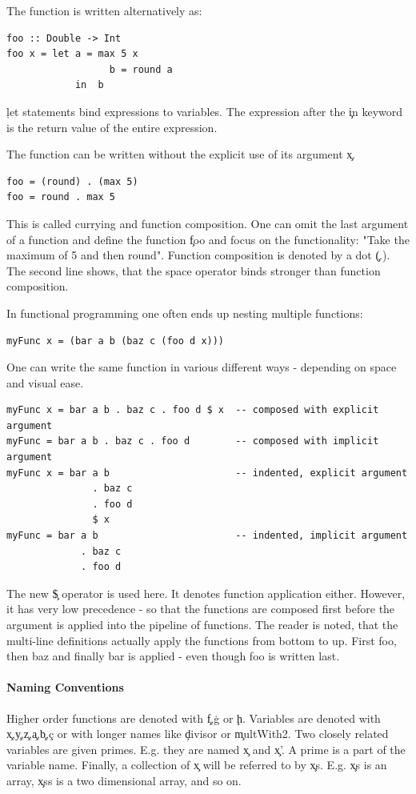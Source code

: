     The function is written alternatively as:
    \begin{lstlisting}
foo :: Double -> Int
foo x = let a = max 5 x
                  b = round a
            in  b
    \end{lstlisting}
    \c{let} statements bind expressions to variables.
    The expression after the \c{in} keyword is the return value of the
    entire expression.
    
    The function can be written without the explicit use of its argument \c{x}.
    \begin{lstlisting}
foo = (round) . (max 5)
foo = round . max 5
    \end{lstlisting}
    This is called currying and function composition.
    One can omit the last argument of a function and define the function
    \c{foo} and focus on the functionality: "Take the maximum of 5 and then round".
    Function composition is denoted by a dot \c{(.)}.
    The second line shows, that the space operator binds stronger than function composition.
    
    In functional programming one often ends up nesting multiple functions:
    \begin{lstlisting}
myFunc x = (bar a b (baz c (foo d x)))
    \end{lstlisting}
    One can write the same function in various different ways - depending on space
    and visual ease.
    \begin{lstlisting}
myFunc x = bar a b . baz c . foo d $ x  -- composed with explicit argument
myFunc = bar a b . baz c . foo d        -- composed with implicit argument
myFunc x = bar a b                      -- indented, explicit argument
               . baz c 
               . foo d
               $ x
myFunc = bar a b                        -- indented, implicit argument
             . baz c
             . foo d
    \end{lstlisting}
    The new \c{\$} operator is used here. It denotes function application either.
    However, it
    has very low precedence - so that the functions are composed first
    before the argument is applied into the pipeline of functions.
    The reader is noted, that the multi-line definitions actually apply
    the functions from bottom to up. First foo, then baz
    and finally bar is applied - even though foo is written last.
    
  \paragraph{Naming Conventions}
    Higher order functions are denoted with \c{f},\c{g} or \c{h}.
    Variables are denoted with \c{x},\c{y},\c{z},\c{a},\c{b},\c{c}
    or with longer names like \c{divisor} or \c{multWith2}.
    Two closely related variables are given
    primes. E.g. they are named \c{x} and \c{x'}. A prime is a part of the variable name.
    Finally, a collection of \c{x} will be referred to by \c{xs}.
    E.g. \c{xs} is an array, \c{xss} is a two dimensional array, and so on.
  
